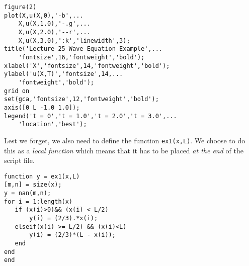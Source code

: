 \begin{lstlisting}[style=myMatlab, name=lec25-ex2]
%% fixed plot, multiple data series
figure(2)
plot(X,u(X,0),'-b',...
    X,u(X,1.0),'-.g',...
    X,u(X,2.0),'--r',...
    X,u(X,3.0),':k','linewidth',3);
title('Lecture 25 Wave Equation Example',...
    'fontsize',16,'fontweight','bold');
xlabel('X','fontsize',14,'fontweight','bold');
ylabel('u(X,T)','fontsize',14,...
    'fontweight','bold');
grid on
set(gca,'fontsize',12,'fontweight','bold');
axis([0 L -1.0 1.0]);
legend('t = 0','t = 1.0','t = 2.0','t = 3.0',...
    'location','best');
\end{lstlisting}

\vspace{1.0cm}

\noindent Lest we forget, we also need to define the function \lstinline[style=myMatlab]{ex1(x,L)}.  We choose to do this as a \emph{local function} which means that it has to be placed \emph{at the end} of the script file.

\begin{lstlisting}[style=myMatlab, name=lec25-ex2]
%% Local functions
function y = ex1(x,L)
[m,n] = size(x);
y = nan(m,n);
for i = 1:length(x)
   if (x(i)>0)&& (x(i) < L/2)
       y(i) = (2/3).*x(i);
   elseif(x(i) >= L/2) && (x(i)<L)
       y(i) = (2/3)*(L - x(i));
   end
end
end
\end{lstlisting}
